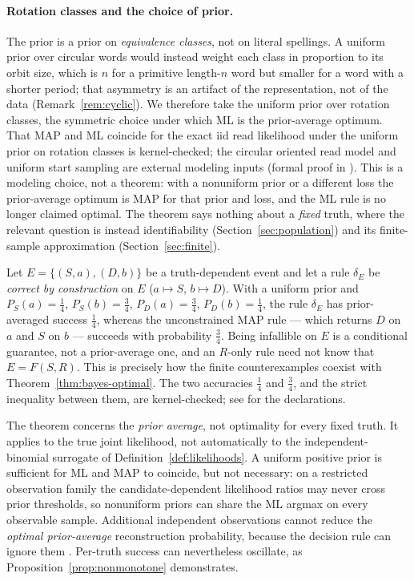 \paragraph{Rotation classes and the choice of prior.}
The prior is a prior on \emph{equivalence classes}, not on literal spellings.
A uniform prior over circular words would instead weight each class in
proportion to its orbit size, which is $n$ for a primitive length-$n$ word but
smaller for a word with a shorter period; that asymmetry is an artifact of the
representation, not of the data (Remark~\ref{rem:cyclic}). We therefore take the
uniform prior over rotation classes, the symmetric choice under which ML is the
prior-average optimum. That MAP and ML coincide for the exact iid read
likelihood under the uniform prior on rotation classes is kernel-checked;
the circular oriented read model and uniform start sampling are external
modeling inputs (formal proof in ). This is a modeling choice, not a theorem: with a
nonuniform prior or a different loss the prior-average optimum is MAP for that
prior and loss, and the ML rule is no longer claimed optimal. The theorem says
nothing about a \emph{fixed} truth, where the relevant question is instead
identifiability (Section~\ref{sec:population}) and its finite-sample
approximation (Section~\ref{sec:finite}).

\begin{remark}
\label{rem:map-vs-infallible}
Let $E=\{(S,a),(D,b)\}$ be a truth-dependent event and let a rule $\delta_E$ be
\emph{correct by construction} on $E$ ($a\mapsto S$, $b\mapsto D$). With a
uniform prior and $P_S(a)=\tfrac14$, $P_S(b)=\tfrac34$, $P_D(a)=\tfrac34$,
$P_D(b)=\tfrac14$, the rule $\delta_E$ has prior-averaged success
$\tfrac14$, whereas the unconstrained MAP rule --- which returns $D$ on $a$ and
$S$ on $b$ --- succeeds with probability $\tfrac34$. Being infallible on $E$ is
a conditional guarantee, not a prior-average one, and an $R$-only rule need not
know that $E=F(S,R)$. This is precisely how the finite counterexamples coexist
with Theorem~\ref{thm:bayes-optimal}. The two accuracies $\tfrac14$ and
$\tfrac34$, and the strict inequality between them, are kernel-checked;
see  for the declarations.
\end{remark}

The theorem concerns the \emph{prior average}, not optimality for every
fixed truth. It applies to the true joint likelihood, not automatically to
the independent-binomial surrogate of Definition~\ref{def:likelihoods}.
A uniform positive prior is sufficient for ML and MAP to coincide, but not
necessary: on a restricted observation family the candidate-dependent
likelihood ratios may never cross prior thresholds, so nonuniform priors can
share the ML argmax on every observable sample.
Additional independent observations cannot reduce the \emph{optimal
prior-average} reconstruction probability, because the decision rule can
ignore them \parencite{berger1985}. Per-truth success can nevertheless oscillate,
as Proposition~\ref{prop:nonmonotone} demonstrates.



